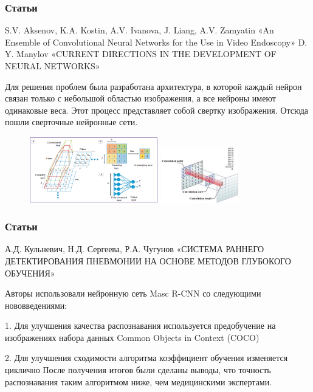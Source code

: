 \documentclass[
	fullscreen=true, 
	bookmarks=false,
	sans serif,
	9pt,
	pdf,
	hyperref={
		pdfpagelabels=false,
		unicode=true
	}
]{beamer}
\begin{document}
	\begin{frame}[fragile]\frametitle{Статьи}	
		S.V. Aksenov, K.A. Kostin, A.V. Ivanova, J. Liang, A.V. Zamyatin «An Ensemble of Convolutional Neural Networks for the Use in Video Endoscopy»
D. Y. Manylov «CURRENT DIRECTIONS IN THE DEVELOPMENT OF NEURAL NETWORKS»

Для решения проблем была разработана архитектура, в которой каждый нейрон связан только с небольшой областью изображения, а все нейроны имеют одинаковые веса. Этот процесс представляет собой свертку изображения. Отсюда пошли сверточные нейронные сети.

        \begin{figure}[h]
            \centering
            \includegraphics[width=0.50\textwidth]{img/picture_1.png}
            \includegraphics[width=0.30\textwidth]{img/picture_2.png}
        \end{figure}

	\end{frame}
	
	\begin{frame}[fragile]\frametitle{Статьи}	
		А.Д. Кульневич, Н.Д. Сергеева, Р.А. Чугунов «СИСТЕМА РАННЕГО ДЕТЕКТИРОВАНИЯ ПНЕВМОНИИ НА ОСНОВЕ МЕТОДОВ ГЛУБОКОГО ОБУЧЕНИЯ»

Авторы использовали нейронную сеть Masc R-CNN со следующими нововведениями:

1.	Для улучшения качества распознавания используется предобучение на изображениях набора данных Common Objects in Context (COCO)


2.	Для улучшения сходимости алгоритма коэффициент обучения изменяется циклично
После получения итогов были сделаны выводы, что точность распознавания таким алгоритмом ниже, чем медицинскими экспертами.

	\end{frame}
	
\end{document}
